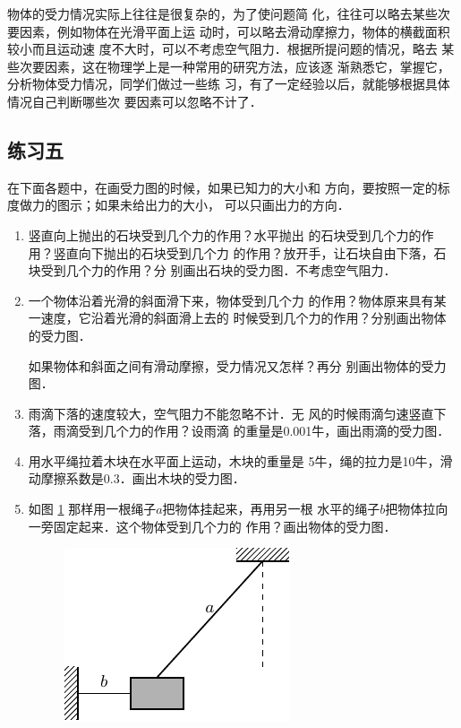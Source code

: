     物体的受力情况实际上往往是很复杂的，为了使问题简
化，往往可以略去某些次要因素，例如物体在光滑平面上运
动时，可以略去滑动摩擦力，物体的横截面积较小而且运动速
度不大时，可以不考虑空气阻力．根据所提问题的情况，略去
某些次要因素，这在物理学上是一种常用的研究方法，应该逐
渐熟悉它，掌握它，分析物体受力情况，同学们做过一些练
习，有了一定经验以后，就能够根据具体情况自己判断哪些次
要因素可以忽略不计了．

\subsection*{练习五} 
    在下面各题中，在画受力图的时候，如果已知力的大小和
方向，要按照一定的标度做力的图示；如果未给出力的大小，
可以只画出力的方向．
\begin{enumerate} 
\item 竖直向上抛出的石块受到几个力的作用？水平抛出
的石块受到几个力的作用？竖直向下抛出的石块受到几个力
的作用？放开手，让石块自由下落，石块受到几个力的作用？分
别画出石块的受力图．不考虑空气阻力．

\item 一个物体沿着光滑的斜面滑下来，物体受到几个力
的作用？物体原来具有某一速度，它沿着光滑的斜面滑上去的
时候受到几个力的作用？分别画出物体的受力图．

    如果物体和斜面之间有滑动摩擦，受力情况又怎样？再分
别画出物体的受力图．

\item 雨滴下落的速度较大，空气阻力不能忽略不计．无
风的时候雨滴匀速竖直下落，雨滴受到几个力的作用？设雨滴
的重量是0.001牛，画出雨滴的受力图．

\item 用水平绳拉着木块在水平面上运动，木块的重量是
5牛，绳的拉力是10牛，滑动摩擦系数是0.3．画出木块的受力图．

\item 如图 \ref{fig_A_1-21} 那样用一根绳子$a$把物体挂起来，再用另一根
水平的绳子$b$把物体拉向一旁固定起来．这个物体受到几个力的
作用？画出物体的受力图．

\begin{figure} [htp]\centering
\includegraphics{fig/A/1-21.pdf} 
\caption{} \label{fig_A_1-21} 
\end{figure} 


\end{enumerate}
